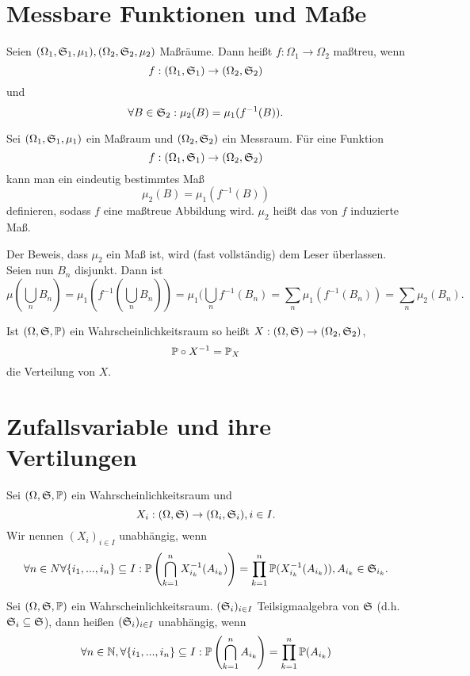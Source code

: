 		\section{Messbare Funktionen und Maße}
			\begin{defi}
				Seien $(\Omega_1,\mf{S}_1,\mu_1),(\Omega_2,\mf{S}_2,\mu_2)$ Maßräume. Dann heißt $f:\Omega_1\to \Omega_2$ maßtreu, wenn
				\[ f: (\Omega_1,\mf{S}_1)\to (\Omega_2, \mf{S}_2) \]
				und
				\[ \forall B\in\mf{S}_2: \mu_2(B)=\mu_1(f^{-1}(B)). \]
			\end{defi}
			
			\begin{satz}
				Sei $(\Omega_1,\mf{S}_1,\mu_1)$ ein Maßraum und $(\Omega_2,\mf{S}_2)$ ein Messraum. Für eine Funktion
				\[ f:(\Omega_1,\mf{S}_1)\to (\Omega_2,\mf{S}_2) \]
				kann man ein eindeutig bestimmtes Maß
				\[ \mu_2(B)=\mu_1(f^{-1}(B)) \]
				definieren, sodass $f$ eine maßtreue Abbildung wird. $\mu_2$ heißt das von $f$ induzierte Maß. 
			\end{satz}
			
			\begin{bew}
				Der Beweis, dass $\mu_2$ ein Maß ist, wird (fast vollständig) dem Leser überlassen. Seien nun $B_n$ disjunkt. Dann ist
				\[ \mu(\bigcup_n B_n)=\mu_1(f^{-1}(\bigcup_n B_n))=\mu_1(\bigcup_n f^{-1}(B_n)=\sum_n \mu_1(f^{-1}(B_n))=\sum_n\mu_2(B_n). \]
			\end{bew}
			
			\begin{bem}
				Ist $(\Omega,\mf{S}, \P)$ ein Wahrscheinlichkeitsraum so heißt $X:(\Omega,\mf{S})\to(\Omega_2,\mf{S}_2)$,
				\[ \P\circ X^{-1}=\P_X \]
				die Verteilung von $X$. 
			\end{bem}
			
		\section[Zufallsvariable/Verteilungen]{Zufallsvariable und ihre Vertilungen}
			\begin{defi}
				Sei $(\Omega,\mf{S},\P)$ ein Wahrscheinlichkeitsraum und 
				\[ X_i: (\Omega,\mf{S})\to (\Omega_i, \mf{S}_i), i\in I. \]
				Wir nennen $(X_i)_{i\in I}$ unabhängig, wenn 
				\[ \forall n\in N\forall \{i_1,...,i_n\}\subseteq I: \P\left(\bigcap_{k=1}^n X_{i_k}^{-1}(A_{i_k})\right)=\prod_{k=1}^n\P(X_{i_k}^{-1}(A_{i_k})), A_{i_k}\in\mf{S}_{i_k}. \]
			\end{defi}
			
			\begin{bem}
				Sei $(\Omega, \mf{S}, \P)$ ein Wahrscheinlichkeitsraum. $(\mf{S}_i)_{i\in I}$ Teilsigmaalgebra von $\mf{S}$ (d.h. $\mf{S}_i\subseteq\mf{S}$), dann heißen $(\mf{S}_i)_{i\in I}$ unabhängig, wenn 
				\[ \forall n\in \N,\forall \{i_1,...,i_n\}\subseteq I:\P\left(\bigcap_{k=1}^n A_{i_k}\right)=\prod_{k=1}^{n}\P(A_{i_k}) \]
			\end{bem}
			
